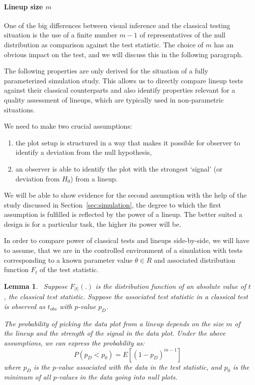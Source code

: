 \documentclass{article}
\newcommand{\red}[1]{{\color{red} #1}}
\newcommand{\hh}[1]{{\color{orange} #1}} %
\newtheorem{lemma}[thm]{Lemma}
\begin{document}

\noindent
\paragraph{Lineup size $m$}
One of the big differences between visual inference and the classical testing situation is the use of a finite number $m-1$ of representatives of the null distribution as comparison against the test statistic. The choice of $m$ has an obvious impact on the test, and we will discuss this in the following paragraph.

The following properties are only derived for the situation of a  fully parameterized  simulation study. This allows us to directly compare lineup tests against their classical counterparts and also identify  properties relevant for a quality assessment of  lineups, which are typically used  in non-parametric situations.

We need to make two crucial assumptions:
\begin{enumerate} \itemsep 0in
\item  the plot setup is structured in a way that makes it possible for observer to identify a deviation from the null hypothesis,
\item an observer is able to identify the plot with the strongest `signal' (or deviation from $H_0$)  from a lineup.
\end{enumerate}
We will be able to show evidence for the second assumption with the help of the study discussed in Section~\ref{sec:simulation}, \hh{the degree to which the first assumption is fulfilled is reflected} by the power of a lineup. The better suited a design is for a particular task, the higher its power will be.

\hh{In order to compare power of classical tests and lineups side-by-side, we will have to assume, that we are in the controlled environment of a simulation with tests corresponding to a known parameter value $\theta \in R$ and associated distribution function $F_t$ of the test statistic. }

\begin{lemma}~\label{lemma}
Suppose $F_{|t|}(.)$ is the distribution function of an absolute value of $t$, the classical test statistic. Suppose the associated test statistic in a classical test is observed as  $t_{obs}$ with $p$-value $p_D$. 

The probability of picking the data plot from a lineup depends on the size $m$ of the lineup and the strength of the signal in the data plot. 
Under the above assumptions, we can express the probability as:
\[
P(p_D < p_0) =  E\left[ (1 - p_D)^{m-1}\right]
\]
where $p_D$ is the $p$-value associated with the data in the test statistic, and $p_0$ is the minimum of all $p$-values in the data going into null plots.
\end{lemma}
\end{document}
